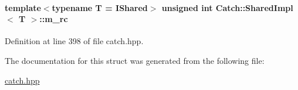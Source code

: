 \paragraph[{m\+\_\+rc}]{\setlength{\rightskip}{0pt plus 5cm}template$<$typename T = I\+Shared$>$ unsigned int {\bf Catch\+::\+Shared\+Impl}$<$ T $>$\+::m\+\_\+rc\hspace{0.3cm}{\ttfamily [mutable]}}\label{a00074_a7e71ef1985b85aa41a1632f932a96bcb}


Definition at line 398 of file catch.\+hpp.



The documentation for this struct was generated from the following file\+:\begin{DoxyCompactItemize}
\item 
\hyperlink{a00094}{catch.\+hpp}\end{DoxyCompactItemize}
